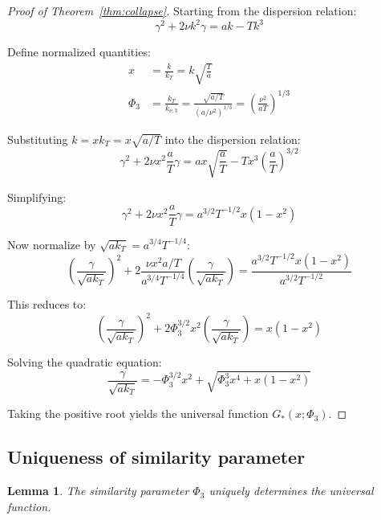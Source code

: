 \documentclass[aps,pre,twocolumn,showpacs,superscriptaddress]{revtex4-2}
\newtheorem{lemma}[theorem]{Lemma}
\theoremstyle{definition}
\begin{document}
\begin{proof}[Proof of Theorem~\ref{thm:collapse}]
Starting from the dispersion relation:
\begin{equation}
\gamma^2 + 2\nu k^2 \gamma = ak - Tk^3
\end{equation}

Define normalized quantities:
\begin{align}
x &= \frac{k}{k_T} = k\sqrt{\frac{T}{a}} \\
\Phi_3 &= \frac{k_T}{k_{\nu,3}} = \frac{\sqrt{a/T}}{(a/\nu^2)^{1/3}} = \left(\frac{\nu^2}{aT}\right)^{1/3}
\end{align}

Substituting $k = xk_T = x\sqrt{a/T}$ into the dispersion relation:
\begin{equation}
\gamma^2 + 2\nu x^2 \frac{a}{T} \gamma = ax\sqrt{\frac{a}{T}} - Tx^3\left(\frac{a}{T}\right)^{3/2}
\end{equation}

Simplifying:
\begin{equation}
\gamma^2 + 2\nu x^2 \frac{a}{T} \gamma = a^{3/2}T^{-1/2}x(1-x^2)
\end{equation}

Now normalize by $\sqrt{ak_T} = a^{3/4}T^{-1/4}$:
\begin{equation}
\left(\frac{\gamma}{\sqrt{ak_T}}\right)^2 + 2\frac{\nu x^2 a/T}{a^{3/4}T^{-1/4}}\left(\frac{\gamma}{\sqrt{ak_T}}\right) = \frac{a^{3/2}T^{-1/2}x(1-x^2)}{a^{3/2}T^{-1/2}}
\end{equation}

This reduces to:
\begin{equation}
\left(\frac{\gamma}{\sqrt{ak_T}}\right)^2 + 2\Phi_3^{3/2}x^2\left(\frac{\gamma}{\sqrt{ak_T}}\right) = x(1-x^2)
\end{equation}

Solving the quadratic equation:
\begin{equation}
\frac{\gamma}{\sqrt{ak_T}} = -\Phi_3^{3/2}x^2 + \sqrt{\Phi_3^3x^4 + x(1-x^2)}
\end{equation}

Taking the positive root yields the universal function $G_*(x;\Phi_3)$.
\end{proof}

\subsection{Uniqueness of similarity parameter}

\begin{lemma}
The similarity parameter $\Phi_3$ uniquely determines the universal function.
\end{lemma}
\end{document}
